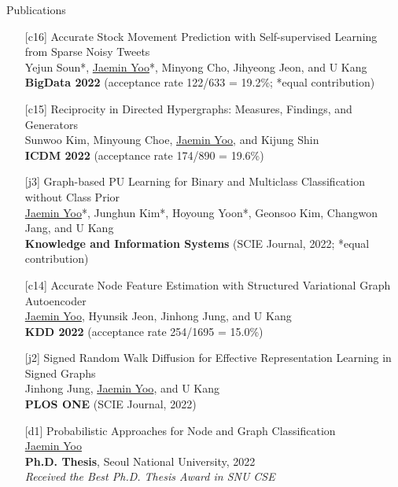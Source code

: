 \documentclass{resume} %
\begin{document}
\begin{rSection}{Publications}
\smallskip
\begin{enumerate}[leftmargin=*]

	\item[{[c16]}]
		Accurate Stock Movement Prediction with Self-supervised Learning from Sparse Noisy Tweets \\
		Yejun Soun*, \underline{Jaemin Yoo}*, Minyong Cho, Jihyeong Jeon, and U Kang \\
		\textbf{BigData 2022} (acceptance rate 122/633 = 19.2\%; *equal contribution) \\

	\item[{[c15]}]
		Reciprocity in Directed Hypergraphs: Measures, Findings, and Generators \\
		Sunwoo Kim, Minyoung Choe, \underline{Jaemin Yoo}, and Kijung Shin \\
		\textbf{ICDM 2022} (acceptance rate 174/890 = 19.6\%) \\

	\item[{[j3]}]
		Graph-based PU Learning for Binary and Multiclass Classification without Class Prior \\
		\underline{Jaemin Yoo}*, Junghun Kim*, Hoyoung Yoon*, Geonsoo Kim, Changwon Jang, and U Kang \\
		\textbf{Knowledge and Information Systems} (SCIE Journal, 2022; *equal contribution) \\

	\item[{[c14]}]
		Accurate Node Feature Estimation with Structured Variational Graph Autoencoder \\
		\underline{Jaemin Yoo}, Hyunsik Jeon, Jinhong Jung, and U Kang \\
		\textbf{KDD 2022} (acceptance rate 254/1695 = 15.0\%) \\

	\item[{[j2]}]
		Signed Random Walk Diffusion for Effective Representation Learning in Signed Graphs \\
		Jinhong Jung, \underline{Jaemin Yoo}, and U Kang \\
		\textbf{PLOS ONE} (SCIE Journal, 2022)

	\item[{[d1]}]
		Probabilistic Approaches for Node and Graph Classification \\
		\underline{Jaemin Yoo} \\
		\textbf{Ph.D. Thesis}, Seoul National University, 2022 \\
		\emph{Received the Best Ph.D. Thesis Award in SNU CSE}


\end{enumerate}
\end{rSection}
\end{document}
